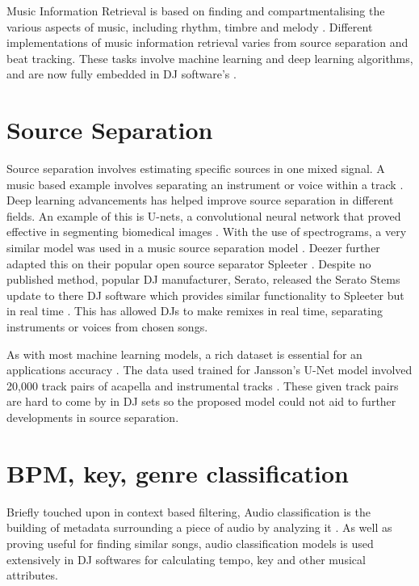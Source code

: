 Music Information Retrieval is based on finding and compartmentalising the various aspects of music, including rhythm, timbre and melody \citep{orio_music_2006}. Different implementations of music information retrieval varies from source separation and beat tracking. These tasks involve machine learning and deep learning algorithms, and are now fully embedded in DJ software's \citep{rekordbox_rekordbox_2020}. 

\section{Source Separation}

Source separation involves estimating specific sources in one mixed signal. A music based example involves separating an instrument or voice within a track \citep{sgouros_efficient_2022}. Deep learning advancements has helped improve source separation in different fields. An example of this is U-nets, a convolutional neural network that proved effective in segmenting biomedical images \citep{ronneberger_u-net_2015}. With the use of spectrograms, a very similar model was used in a music source separation model \citep{jansson_singing_2017}. Deezer  further adapted this on their popular open source separator Spleeter \citep{hennequin_spleeter_2020}. Despite no published method, popular DJ manufacturer, Serato, released the Serato Stems update to there DJ software which provides similar functionality to Spleeter but in real time \citep{kirn_review_2023}. This has allowed DJs to make remixes in real time, separating instruments or voices from chosen songs.

As with most machine learning models, a rich dataset is essential for an applications accuracy \citep{jain_overview_2020}. The data used trained for Jansson's U-Net model involved 20,000 track pairs of acapella and instrumental tracks \citep{jansson_singing_2017}. These given track pairs are hard to come by in DJ sets so the proposed model could not aid to further developments in source separation.


\section{BPM, key, genre classification}
Briefly touched upon in context based filtering, Audio classification is the building of metadata surrounding a piece of audio by analyzing it \citep{sharma_audio_2021}. As well as proving useful for finding similar songs, audio classification models is used extensively in DJ softwares for calculating tempo, key and other musical attributes.

